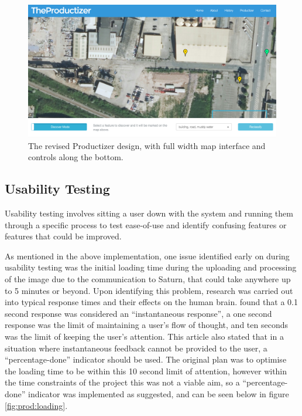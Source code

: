 \begin{figure}[H]
    \centering
    \includegraphics[width=\textwidth]{figs/6/6-testing-newdesign}
    \caption{The revised Productizer design, with full width map interface and controls along the bottom.}
    \label{fig:prod:newdesign}
\end{figure}



\subsection{Usability Testing} \label{section:productizer:usability}

Usability testing involves sitting a user down with the system and running them through a specific process to test ease-of-use and identify confusing features or features that could be improved.

As mentioned in the above implementation, one issue identified early on during usability testing was the initial loading time during the uploading and processing of the image due to the communication to Saturn, that could take anywhere up to 5 minutes or beyond. Upon identifying this problem, research was carried out into typical response times and their effects on the human brain. \cite{nielsen_1993} found that a 0.1 second response was considered an “instantaneous response”, a one second response was the limit of maintaining a user’s flow of thought, and ten seconds was the limit of keeping the user’s attention. This article also stated that in a situation where instantaneous feedback cannot be provided to the user, a “percentage-done” indicator should be used. The original plan was to optimise the loading time to be within this 10 second limit of attention, however within the time constraints of the project this was not a viable aim, so a “percentage-done” indicator was implemented as suggested, and can be seen below in figure \ref{fig:prod:loading}.


